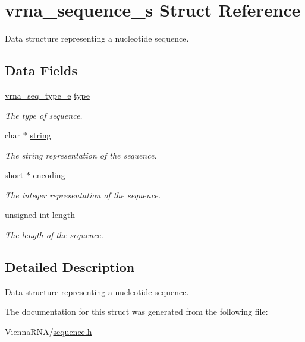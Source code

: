 \hypertarget{structvrna__sequence__s}{}\section{vrna\+\_\+sequence\+\_\+s Struct Reference}
\label{structvrna__sequence__s}


Data structure representing a nucleotide sequence.  


\subsection*{Data Fields}
\begin{DoxyCompactItemize}
\item 
\mbox{\label{structvrna__sequence__s_aee11f4cc6f792cd36afab3bf7a30ca7b}} 
\hyperlink{sequence_8h_a85cda3fcf5d6bd7ec090d3a96e808609}{vrna\+\_\+seq\+\_\+type\+\_\+e} \hyperlink{structvrna__sequence__s_aee11f4cc6f792cd36afab3bf7a30ca7b}{type}
\begin{DoxyCompactList}\small\item\em The type of sequence. \end{DoxyCompactList}\item 
\mbox{\label{structvrna__sequence__s_aa885a2c52b3f87fb6c8f51a77a3430a7}} 
char $\ast$ \hyperlink{structvrna__sequence__s_aa885a2c52b3f87fb6c8f51a77a3430a7}{string}
\begin{DoxyCompactList}\small\item\em The string representation of the sequence. \end{DoxyCompactList}\item 
\mbox{\label{structvrna__sequence__s_a8010ad82da6766e859e6f25e275a1d89}} 
short $\ast$ \hyperlink{structvrna__sequence__s_a8010ad82da6766e859e6f25e275a1d89}{encoding}
\begin{DoxyCompactList}\small\item\em The integer representation of the sequence. \end{DoxyCompactList}\item 
\mbox{\label{structvrna__sequence__s_af60876d93312ce0b842574a14c3a9cdd}} 
unsigned int \hyperlink{structvrna__sequence__s_af60876d93312ce0b842574a14c3a9cdd}{length}
\begin{DoxyCompactList}\small\item\em The length of the sequence. \end{DoxyCompactList}\end{DoxyCompactItemize}


\subsection{Detailed Description}
Data structure representing a nucleotide sequence. 

The documentation for this struct was generated from the following file\+:\begin{DoxyCompactItemize}
\item 
Vienna\+R\+N\+A/\hyperlink{sequence_8h}{sequence.\+h}\end{DoxyCompactItemize}
